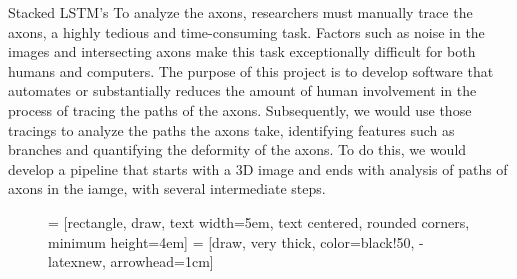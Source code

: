 \documentclass[final]{beamer}
\newlength{\colwidth}
\begin{document}
\begin{frame}[t]
\begin{columns}[t]
\begin{column}{\colwidth}
\begin{block}{Stacked LSTM's}
To analyze the axons, researchers must manually trace the axons, a highly tedious and time-consuming task. Factors such as noise in the images and intersecting axons make this task exceptionally difficult for both humans and computers. The purpose of this project is to develop software that automates or substantially reduces the amount of human involvement in the process of tracing the paths of the axons. Subsequently, we would use those tracings to analyze the paths the axons take, identifying features such as branches and quantifying the deformity of the axons. To do this, we would develop a pipeline that starts with a 3D image and ends with analysis of paths of axons in the iamge, with several intermediate steps.

\begin{figure}

 = [rectangle, draw, %
    text width=5em, text centered, rounded corners, minimum height=4em]
 = [draw, very thick, color=black!50, -latexnew, arrowhead=1cm]



\end{figure}
\end{block}
\end{column}
\end{columns}
\end{frame}
\end{document}
